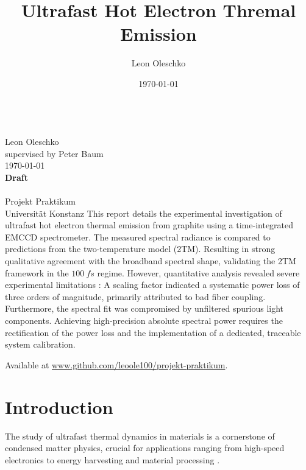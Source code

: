 \documentclass[
	a4paper,
]{scrarticle}
\begin{document}
\author{Leon Oleschko}
\date{\dotdate\today}

\begin{titlepage}
    \sffamily
    \vspace*{3cm}
    {
        \fontsize{32}{32}
        \title{Ultrafast Hot Electron Thremal Emission}
    }
    \vspace{.25cm}\\
    {
        \Large
        Leon Oleschko\\
        supervised by Peter Baum
        \vspace{.05cm}\\
        \dotdate\today\\
        \textbf{Draft}\\
        \vspace{.05cm}\\
        \normalsize
        Projekt Praktikum\\
        Universität Konstanz
    }
    \vfill
    {
        \normalfont\normalsize
        This report details the experimental investigation of ultrafast hot electron thermal emission from graphite using a time-integrated EMCCD spectrometer. The measured spectral radiance is compared to predictions from the two-temperature model (2TM). Resulting in strong qualitative agreement with the broadband spectral shape, validating the 2TM framework in the $\SI{100}{fs}$ regime. 
        However, quantitative analysis revealed severe experimental limitations : A scaling factor indicated a systematic power loss of three orders of magnitude, primarily attributed to bad fiber coupling. Furthermore, the spectral fit was compromised by unfiltered spurious light components. Achieving high-precision absolute spectral power requires the rectification of the power loss and the implementation of a dedicated, traceable system calibration.
    }
    \vfill
    \begin{flushright}
        Available at \url{www.github.com/leoole100/projekt-praktikum}.
    \end{flushright}
\end{titlepage}


\clearpage

\section{Introduction}
The study of ultrafast thermal dynamics in materials is a cornerstone of condensed matter physics, crucial for applications ranging from high-speed electronics to energy harvesting and material processing \cite{tangPlasmonicHotElectrons2020,konigHotCarrierSolar2010}. 
\end{document}
